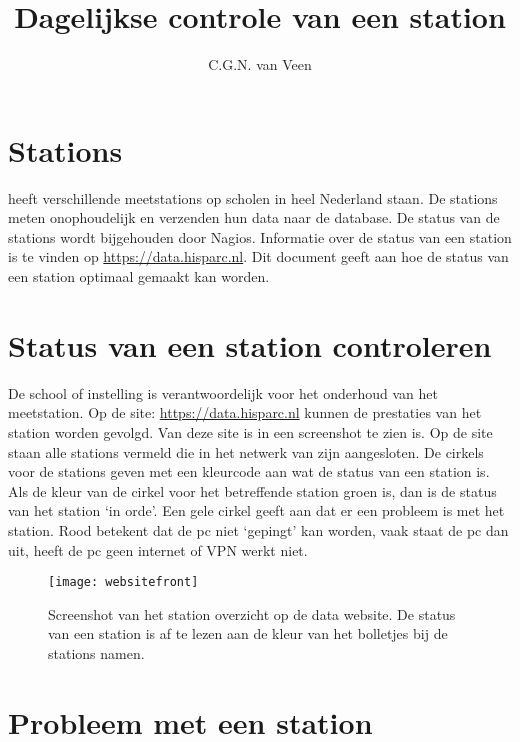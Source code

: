 

\title{Dagelijkse controle van een station}
\author{C.G.N. van Veen}



\maketitle

\section{Stations}

\hisparc heeft verschillende meetstations op scholen in heel Nederland
staan. De stations meten onophoudelijk en verzenden hun data naar de
\hisparc database. De status van de \hisparc stations wordt bijgehouden
door Nagios. Informatie over de status van een station is te vinden op
\url{https://data.hisparc.nl}. Dit document geeft aan hoe de status van
een station optimaal gemaakt kan worden.


\section{Status van een station controleren}

De school of instelling is verantwoordelijk voor het onderhoud van het
meetstation. Op de site: \url{https://data.hisparc.nl} kunnen de
prestaties van het station worden gevolgd. Van deze site is in
 een screenshot te zien is. Op de site staan alle
stations vermeld die in het netwerk van \hisparc zijn aangesloten. De
cirkels voor de stations geven met een kleurcode aan wat de status van
een station is. Als de kleur van de cirkel voor het betreffende station
groen is, dan is de status van het station `in orde'. Een gele cirkel
geeft aan dat er een probleem is met het station. Rood betekent dat de
pc niet `gepingt' kan worden, vaak staat de pc dan uit, heeft de pc geen
internet of VPN werkt niet.

\begin{figure}
    \centering \texttt{[image: websitefront]}
    \caption{Screenshot van het station overzicht op de \hisparc data
             website. De status van een station is af te lezen aan de
             kleur van het bolletjes bij de stations namen.} 
    \label{fig:frontweb}
\end{figure}


\section{Probleem met een station}

